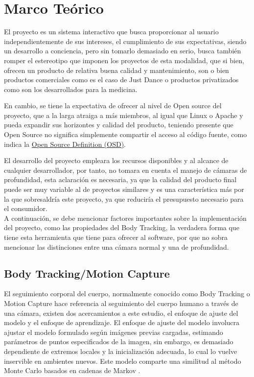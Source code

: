 \chapter{Marco Teórico}

El proyecto es un sistema interactivo que busca proporcionar al usuario independientemente de sus intereses, el cumplimiento de sus expectativas, siendo un desarrollo a conciencia, pero sin tomarlo demasiado en serio, busca también romper el estereotipo que imponen los proyectos de esta modalidad, que si bien, ofrecen un producto de relativa buena calidad y mantenimiento, son o bien productos comerciales como es el caso de Just Dance o productos privatizados como son los desarrollados para la medicina. 

En cambio, se tiene la expectativa de ofrecer al nivel de Open source del proyecto, que a la larga atraiga a más miembros, al igual que Linux o Apache y pueda expandir sus horizontes y calidad del producto, teniendo presente que Open Source no significa simplemente compartir el acceso al código fuente, como indica la \href{https://opensource.org/docs/definition.html}{Open Source Definition (OSD)}. 

El desarrollo del proyecto empleara los recursos disponibles y al alcance de cualquier desarrollador, por tanto, no tomara en cuenta el manejo de cámaras de profundidad, esta aclaración es necesaria, ya que la calidad del producto final puede ser muy variable al de proyectos similares y es una característica más por la que sobresaldría este proyecto, ya que reduciría el presupuesto necesario para el consumidor.\\

A continuación, se debe mencionar factores importantes sobre la implementación del proyecto, como las propiedades del Body Tracking, la verdadera forma que tiene esta herramienta que tiene para ofrecer al software, por que no sobra mencionar las distinciones entre una cámara normal y una de profundidad.



\section{Body Tracking/Motion Capture}

El seguimiento corporal del cuerpo, normalmente conocido como Body Tracking o Motion Capture hace referencia al seguimiento del cuerpo humano a través de una cámara, existen dos acercamientos a este estudio, el enfoque de ajuste del modelo y el enfoque de aprendizaje. El enfoque de ajuste del modelo involucra ajustar el modelo formulado según imágenes previas cargadas, estimando parámetros de puntos especificados de la imagen, sin embargo, es demasiado dependiente de extremos locales y la inicialización adecuada, lo cual lo vuelve inservible en ambientes nuevos. Este modelo comparte una similitud al método Monte Carlo basados en cadenas de Markov \cite{siddiqui2010human}.

